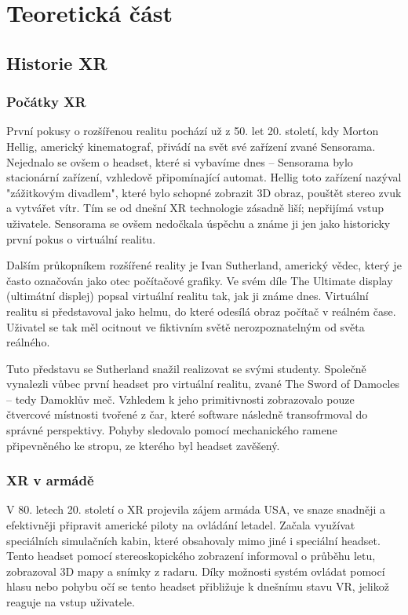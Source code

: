 \part{Teoretická část}

\chapter{Historie XR}

\section{Počátky XR}

První pokusy o rozšířenou realitu pochází už z 50. let 20. století, kdy Morton Hellig, americký kinematograf, přivádí na svět své zařízení zvané Sensorama. Nejednalo se ovšem o headset, které si vybavíme dnes -- Sensorama bylo stacionární zařízení, vzhledově připomínající automat. Hellig toto zařízení nazýval "zážitkovým divadlem", které bylo schopné zobrazit 3D obraz, pouštět stereo zvuk a vytvářet vítr. Tím se od dnešní XR technologie zásadně liší; nepřijímá vstup uživatele. Sensorama se ovšem nedočkala úspěchu a známe ji jen jako historicky první pokus o virtuální realitu. \cite{otechnice}

Dalším průkopníkem rozšířené reality je Ivan Sutherland, americký vědec, který je často označován jako otec počítačové grafiky. Ve svém díle The Ultimate display (ultimátní displej) popsal virtuální realitu tak, jak ji známe dnes. Virtuální realitu si představoval jako helmu, do které odesílá obraz počítač v reálném čase. Uživatel se tak měl ocitnout ve fiktivním světě nerozpoznatelným od světa reálného. \cite{otechnice} \cite{ivan_sutherland_bio}

Tuto představu se Sutherland snažil realizovat se svými studenty. Společně vynalezli vůbec první headset pro virtuální realitu, zvané The Sword of Damocles -- tedy Damoklův meč. Vzhledem k jeho primitivnosti zobrazovalo pouze čtvercové místnosti tvořené z čar, které software následně transofrmoval do správné perspektivy. Pohyby sledovalo pomocí mechanického ramene připevněného ke stropu, ze kterého byl headset zavěšený. \cite{otechnice} \cite{Rheingold_1992}

\section{XR v armádě}

V 80. letech 20. století o XR projevila zájem armáda USA, ve snaze snadněji a efektivněji připravit americké piloty na ovládání letadel. Začala využívat speciálních simulačních kabin, které obsahovaly mimo jiné i speciální headset. Tento headset pomocí stereoskopického zobrazení informoval o průběhu letu, zobrazoval 3D mapy a snímky z radaru. Díky možnosti systém ovládat pomocí hlasu nebo pohybu očí se tento headset přibližuje k dnešnímu stavu VR, jelikož reaguje na vstup uživatele. \cite{otechnice}



